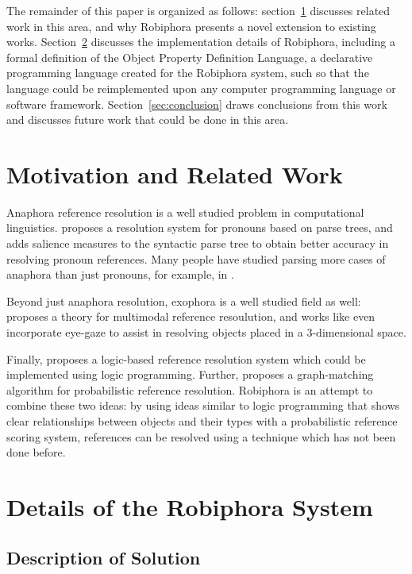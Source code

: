 \documentclass[12pt]{article}
\begin{document}
The remainder of this paper is organized as follows: section~\ref{sec:related}
discusses related work in this area, and why Robiphora presents a novel
extension to existing works. Section~\ref{sec:details} discusses the
implementation details of Robiphora, including a formal definition of the
Object Property Definition Language, a declarative programming language
created for the Robiphora system, such so that the language could be
reimplemented upon any computer programming language or software framework.
Section~\ref{sec:conclusion} draws conclusions from this work and discusses
future work that could be done in this area.

\section{Motivation and Related Work}
\label{sec:related}

Anaphora reference resolution is a well studied problem in computational
linguistics. \cite{hobbs78} proposes a resolution system for pronouns based on
parse trees, and \cite{lappin94} adds salience measures to the syntactic
parse tree to obtain better accuracy in resolving pronoun references. Many
people have studied parsing more cases of anaphora than just pronouns, for
example, in \cite{alkofahi99}.

Beyond just anaphora resolution, exophora is a well studied field as well:
\cite{pineda00} proposes a theory for multimodal reference resoulution, and
works like \cite{prasov08} even incorporate eye-gaze to assist in resolving
objects placed in a 3-dimensional space.

Finally, \cite{pineda97} proposes a logic-based reference resolution system
which could be implemented using logic programming. Further, \cite{chai04}
proposes a graph-matching algorithm for probabilistic reference resolution.
Robiphora is an attempt to combine these two ideas: by using ideas similar to
logic programming that shows clear relationships between objects and their
types with a probabilistic reference scoring system, references can be resolved
using a technique which has not been done before.

\section{Details of the Robiphora System}
\label{sec:details}

\subsection{Description of Solution}
\end{document}

